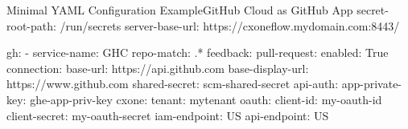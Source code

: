 \begin{code}{Minimal YAML Configuration Example}{GitHub Cloud as GitHub App}{}
secret-root-path: /run/secrets
server-base-url: https://cxoneflow.mydomain.com:8443/

gh:
    - service-name: GHC
      repo-match: .*
      feedback:
        pull-request:
          enabled: True
      connection:
        base-url: https://api.github.com
        base-display-url: https://www.github.com
        shared-secret: scm-shared-secret
        api-auth:
          app-private-key: ghe-app-priv-key
      cxone:
        tenant: mytenant
        oauth:
          client-id: my-oauth-id
          client-secret: my-oauth-secret
        iam-endpoint: US
        api-endpoint: US
\end{code}
  